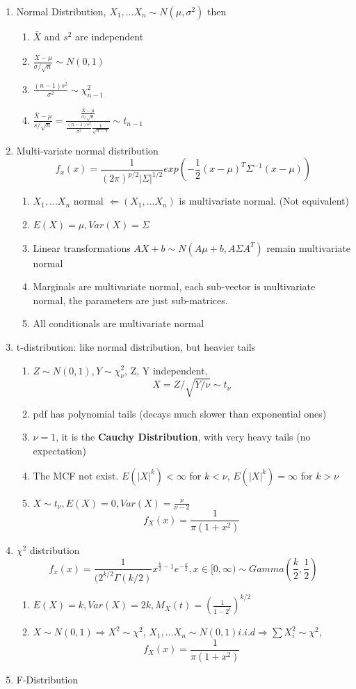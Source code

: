 \documentclass[11pt, openany]{book}              %
\begin{document}
\begin{enumerate}
	\item Normal Distribution, $X_1,...X_n \sim N(\mu,\sigma^2)$ then
	\begin{enumerate}
		\item  $\bar{X}$ and $s^2$ are independent
		\item  $\frac{\bar{X}-\mu}{\sigma/\sqrt{n}} \sim N(0,1)$
		\item  $\frac{(n-1)s^2}{\sigma^2} \sim \chi_{n-1}^2$
		\item  $\frac{\bar{X}-\mu }{s/\sqrt{n}} = \frac{\frac{\bar{X}-\mu}{\sigma/\sqrt{n}}}{\frac{(n-1)s^2}{\sigma^2} \frac{1}{\sqrt{n-1}}} \sim t_{n-1}$
	\end{enumerate}
	\item Multi-variate normal distribution
	$$ f_x(x) = \frac{1}{(2\pi)^{p/2}|\Sigma|^{1/2}}exp(-\frac{1}{2}(x-\mu)^T\Sigma^{-1}(x-\mu))$$
	\begin{enumerate}
		\item $X_1,...X_n$ normal $\Leftarrow (X_1,...X_n)$ is multivariate normal. (Not equivalent)
		\item $E(X)=\mu, Var(X) = \Sigma$
		\item Linear transformations $AX+b \sim N(A\mu+b, A\Sigma A^T)$ remain multivariate normal
		\item Marginals are multivariate normal, each sub-vector is multivariate normal, the parameters are just sub-matrices.
		\item All conditionals are multivariate normal 
	\end{enumerate}
	\item t-distribution: like normal distribution, but heavier tails
	\begin{enumerate}
		\item $Z \sim N(0,1), Y \sim \chi^2_{\nu}$, Z, Y independent, $$ X= Z/\sqrt{Y/\nu} \sim t_{\nu} $$
		\item pdf has polynomial tails (decays much slower than exponential ones)
		\item $\nu=1$, it is the \textbf{Cauchy Distribution}, with very heavy tails (no expectation)
		\item The MCF not exist. $E(|X|^k) < \infty$ for $k<\nu$, $E(|X|^k) = \infty$ for $k>\nu$
		\item $X\sim t_\nu, E(X)=0, Var(X)=\frac{\nu}{\nu-2}$
		$$ f_X(x)=\frac{1}{\pi(1+x^2)}$$
	\end{enumerate}
	\item $\chi^2$ distribution
	$$ f_x(x) = \frac{1}{(2^{k/2}\Gamma(k/2)}x^{\frac{k}{2}-1}e^{-\frac{x}{2}}, x\in [0,\infty) \sim Gamma(\frac{k}{2},\frac{1}{2})$$
	\begin{enumerate}
		\item $E(X)=k, Var(X)=2k, M_X(t)= (\frac{1}{1-2^t})^{k/2}$
		\item $X \sim N(0,1) \Rightarrow X^2 \sim \chi^2$, $X_1,...X_n \sim N(0,1) i.i.d \Rightarrow \sum X_i^2 \sim \chi^2$,
		$$ f_X(x)=\frac{1}{\pi(1+x^2)}$$
	\end{enumerate}	
	\item F-Distribution 
\end{enumerate}
\end{document}
